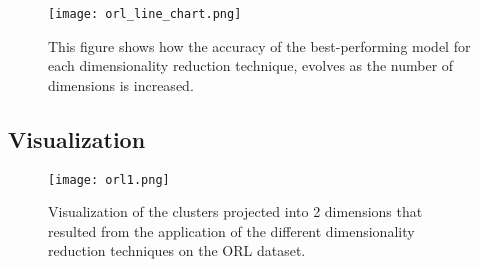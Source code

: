 \begin{figure}[!h]
    \centering
    \texttt{[image: orl\_line\_chart.png]}
    \caption{This figure shows how the accuracy of the best-performing model for each dimensionality reduction technique, evolves as the number of dimensions is increased.}
    \label{fig:orl_line_chart}
\end{figure}

\subsection{Visualization}

\begin{figure}[!h]
    \centering
    \texttt{[image: orl1.png]}
    \caption{Visualization of the clusters projected into 2 dimensions that resulted from the application of the different dimensionality reduction techniques on the ORL dataset.}
    \label{fig:orl}
\end{figure}

